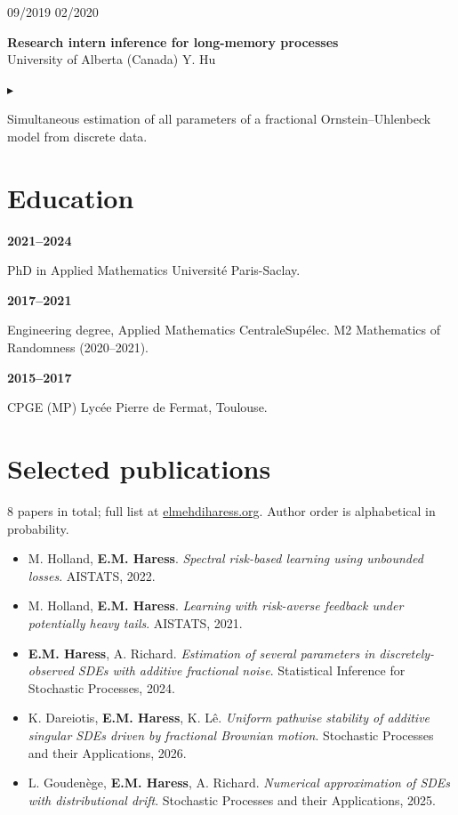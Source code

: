 \documentclass[10pt,a4paper]{article}
\newlength{\datecol}\setlength{\datecol}{0.155\textwidth}
\newlength{\gutter}\setlength{\gutter}{0.85em}
\newlength{\bodycol}
\newcommand{\entry}[3]{%
  \par\vspace{0.50ex}\noindent
  \begin{minipage}[t]{\datecol}
    \vspace{0pt}\raggedright\footnotesize\color{muted}#1
  \end{minipage}%
  \hspace{\gutter}%
  \begin{minipage}[t]{\bodycol}
    \vspace{0pt}\raggedright
    {\headingfont\bfseries\footnotesize #2}\\[0.08ex]
    {\footnotesize\color{accent}#3}
  \end{minipage}%
  \par\vspace{0.10ex}
}
\newenvironment{bullets}
  {\begin{list}{\textcolor{accent}{\scriptsize$\blacktriangleright$}}{%
      \setlength{\leftmargin}{\datecol}
      \addtolength{\leftmargin}{\gutter}
      \addtolength{\leftmargin}{1.15em}
      \setlength{\rightmargin}{0pt}
      \setlength{\labelwidth}{0.85em}
      \setlength{\labelsep}{0.3em}
      \setlength{\itemsep}{0.08ex}
      \setlength{\parsep}{0pt}
      \setlength{\topsep}{0.18ex}
      \setlength{\partopsep}{0pt}
      \footnotesize}}
  {\end{list}}
\newcommand{\skillrow}[2]{%
  \par\noindent
  \begin{minipage}[t]{\datecol}
    \vspace{0pt}\raggedright{\headingfont\bfseries\footnotesize #1}
  \end{minipage}%
  \hspace{\gutter}%
  \begin{minipage}[t]{\bodycol}
    \vspace{0pt}\raggedright\footnotesize #2
  \end{minipage}%
  \par\vspace{0.35ex}
}
\begin{document}
\entry{09/2019 \textemdash{} 02/2020}{Research intern \textemdash{} inference for long-memory processes}{University of Alberta (Canada) \textemdash{} Y. Hu}
\begin{bullets}
  \item Simultaneous estimation of all parameters of a fractional Ornstein--Uhlenbeck model from discrete data.
\end{bullets}

\section{Education}
\skillrow{2021--2024}{PhD in Applied Mathematics \textemdash{} Université Paris-Saclay.}
\skillrow{2017--2021}{Engineering degree, Applied Mathematics \textemdash{} CentraleSupélec. M2 Mathematics of Randomness (2020--2021).}
\skillrow{2015--2017}{CPGE (MP) \textemdash{} Lycée Pierre de Fermat, Toulouse.}

\section{Selected publications}
{\scriptsize\color{muted}8 papers in total; full list at \href{https://elmehdiharess.org}{elmehdiharess.org}. Author order is alphabetical in probability.\par}
\vspace{0.22ex}
\begin{itemize}[leftmargin=1.15em, itemsep=0.10ex, topsep=0pt, parsep=0pt, label={\textcolor{accent}{\scriptsize$\blacktriangleright$}}]
  \scriptsize
  \item M. Holland, \textbf{E.M. Haress}. \emph{Spectral risk-based learning using unbounded losses}. AISTATS, 2022.
  \item M. Holland, \textbf{E.M. Haress}. \emph{Learning with risk-averse feedback under potentially heavy tails}. AISTATS, 2021.
  \item \textbf{E.M. Haress}, A. Richard. \emph{Estimation of several parameters in discretely-observed SDEs
  with additive fractional noise}. Statistical Inference for Stochastic Processes, 2024.
  \item K. Dareiotis, \textbf{E.M. Haress}, K. Lê. \emph{Uniform pathwise stability of additive singular SDEs
  driven by fractional Brownian motion}. Stochastic Processes and their Applications, 2026.
  \item L. Goudenège, \textbf{E.M. Haress}, A. Richard. \emph{Numerical approximation of SDEs with
  distributional drift}. Stochastic Processes and their Applications, 2025.
\end{itemize}
\end{document}
